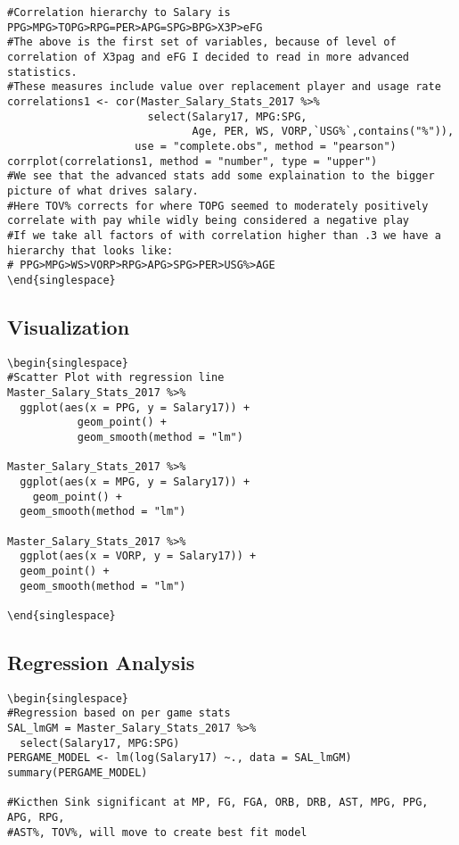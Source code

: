\documentclass{article}
\begin{document}
\begin{flushleft}
\begin{lstlisting}
#Correlation hierarchy to Salary is PPG>MPG>TOPG>RPG=PER>APG=SPG>BPG>X3P>eFG
#The above is the first set of variables, because of level of correlation of X3pag and eFG I decided to read in more advanced statistics.
#These measures include value over replacement player and usage rate
correlations1 <- cor(Master_Salary_Stats_2017 %>%
                      select(Salary17, MPG:SPG,
                             Age, PER, WS, VORP,`USG%`,contains("%")),
                    use = "complete.obs", method = "pearson")
corrplot(correlations1, method = "number", type = "upper")
#We see that the advanced stats add some explaination to the bigger picture of what drives salary.
#Here TOV% corrects for where TOPG seemed to moderately positively correlate with pay while widly being considered a negative play
#If we take all factors of with correlation higher than .3 we have a hierarchy that looks like:
# PPG>MPG>WS>VORP>RPG>APG>SPG>PER>USG%>AGE
\end{singlespace}
\end{lstlisting}
\subsection{Visualization}
\begin{lstlisting}
\begin{singlespace}
#Scatter Plot with regression line
Master_Salary_Stats_2017 %>%
  ggplot(aes(x = PPG, y = Salary17)) + 
           geom_point() +
           geom_smooth(method = "lm")

Master_Salary_Stats_2017 %>%
  ggplot(aes(x = MPG, y = Salary17)) +
    geom_point() +
  geom_smooth(method = "lm")

Master_Salary_Stats_2017 %>%
  ggplot(aes(x = VORP, y = Salary17)) +
  geom_point() +
  geom_smooth(method = "lm")

\end{singlespace}
\end{lstlisting}
\subsection{Regression Analysis}
\begin{lstlisting}
\begin{singlespace}
#Regression based on per game stats
SAL_lmGM = Master_Salary_Stats_2017 %>%
  select(Salary17, MPG:SPG)
PERGAME_MODEL <- lm(log(Salary17) ~., data = SAL_lmGM)
summary(PERGAME_MODEL)

#Kicthen Sink significant at MP, FG, FGA, ORB, DRB, AST, MPG, PPG, APG, RPG,
#AST%, TOV%, will move to create best fit model


\end{lstlisting}
\end{flushleft}
\end{document}
